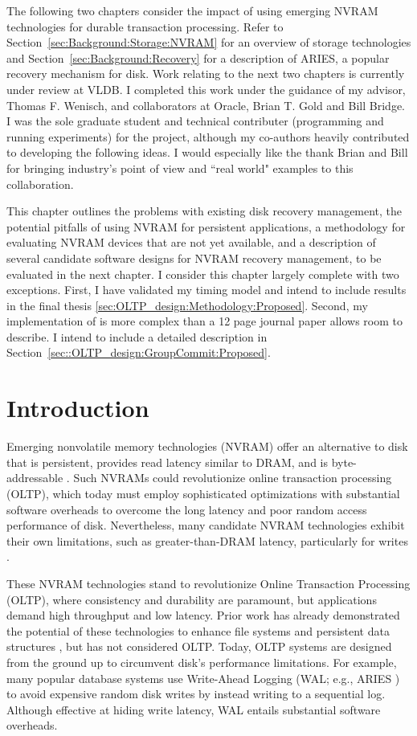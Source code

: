 The following two chapters consider the impact of using emerging NVRAM technologies for durable transaction processing.
Refer to Section~\ref{sec:Background:Storage:NVRAM} for an overview of storage technologies and Section~\ref{sec:Background:Recovery} for a description of ARIES, a popular recovery mechanism for disk.
Work relating to the next two chapters is currently under review at VLDB.
I completed this work under the guidance of my advisor, Thomas F. Wenisch, and collaborators at Oracle, Brian T. Gold and Bill Bridge.
I was the sole graduate student and technical contributer (programming and running experiments) for the project, although my co-authors heavily contributed to developing the following ideas.
I would especially like the thank Brian and Bill for bringing industry's point of view and ``real world" examples to this collaboration.

This chapter outlines the problems with existing disk recovery management, the potential pitfalls of using NVRAM for persistent applications, a methodology for evaluating NVRAM devices that are not yet available, and a description of several candidate software designs for NVRAM recovery management, to be evaluated in the next chapter.
I consider this chapter largely complete with two exceptions.
First, I have validated my timing model and intend to include results in the final thesis \ref{sec:OLTP_design:Methodology:Proposed}.
Second, my implementation of \GroupCommit is more complex than a 12 page journal paper allows room to describe.
I intend to include a detailed description in Section~\ref{sec::OLTP_design:GroupCommit:Proposed}.

\section{Introduction}
\label{sec:OLTP_design:Intro}

Emerging nonvolatile memory technologies (NVRAM) offer an alternative to disk that is persistent, provides read latency similar to DRAM, and is byte-addressable \cite{BurrKurdi08}.
Such NVRAMs could revolutionize online transaction processing (OLTP), which today must employ sophisticated optimizations with substantial software overheads to overcome the long latency and poor random access performance of disk.
Nevertheless, many candidate NVRAM technologies exhibit their own limitations, such as greater-than-DRAM latency, particularly for writes \cite{LeeIpek09}.

These NVRAM technologies stand to revolutionize Online Transaction Processing (OLTP), where consistency and durability are paramount, but applications demand high throughput and low latency.
Prior work has already demonstrated the potential of these technologies to enhance file systems \cite{GreenanMiller06, ConditNightingale09} and persistent data structures \cite{VenkataramanTolia11}, but has not considered OLTP. 
Today, OLTP systems are designed from the ground up to circumvent disk's performance limitations.
For example, many popular database systems use Write-Ahead Logging (WAL; e.g., ARIES \cite{MohanHaderle92}) to avoid expensive random disk writes by instead writing to a sequential log.  
Although effective at hiding write latency, WAL entails substantial software overheads.

